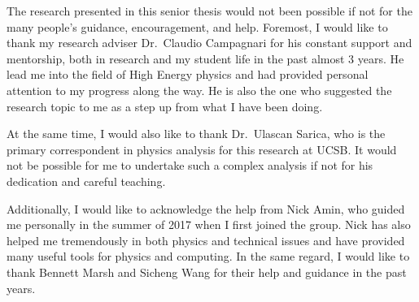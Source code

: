 \begin{acknowledgements}

    The research presented in this senior thesis would not been possible if
    not for the many people's guidance, encouragement, and help. Foremost, I 
    would like to thank my research adviser Dr.\ Claudio Campagnari for his
    constant support and mentorship, both in research and my student life 
    in the past almost 3 years. He lead me into the field of High Energy
    physics and had provided personal attention to my progress along the way.
    He is also the one who suggested the research topic to me as a step up from
    what I have been doing.

    At the same time, I would also like to thank Dr.\ Ulascan Sarica, who is the 
    primary correspondent in physics analysis for this research at UCSB. It would 
    not be possible for
    me to undertake such a complex analysis if not for his dedication and careful
    teaching.

    Additionally, I would like to acknowledge the help from Nick Amin, who guided
    me personally in the summer of 2017 when I first joined the group. Nick has also
    helped me tremendously in both physics and technical issues and have provided many
    useful tools for physics and computing. In the same regard, I would like to thank 
    Bennett Marsh and Sicheng Wang for their help and guidance in the past years.


\end{acknowledgements} 
